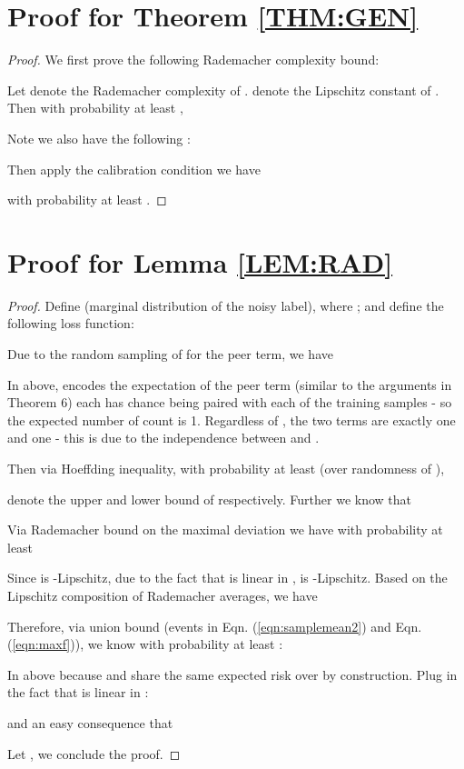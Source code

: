 \section*{Proof for Theorem \ref{THM:GEN}}


\begin{proof}

We first prove the following Rademacher complexity bound:
 \begin{lemma}\label{LEM:RAD}
 Let  denote the Rademacher complexity of .  denote the Lipschitz constant of . Then with probability at least ,  \end{lemma}
Note we also have the following :

Then apply the calibration condition we have

with probability at least .
\end{proof}
\section*{Proof for Lemma \ref{LEM:RAD}}

\begin{proof}
 Define  (marginal distribution of the noisy label), where ; and
define the following loss function:

Due to the random sampling of  for the peer term, we have

In above,   encodes the expectation of the peer term (similar to the arguments in Theorem 6) each  has  chance being paired with each of the training samples - so the expected number of count is 1. Regardless of , the two terms are exactly one  and one  - this is due to the independence between  and .

Then via Hoeffding inequality, with probability at least  (over randomness of ), 

 denote the upper and lower bound of  respectively. Further we know that 




Via Rademacher bound on the maximal deviation we have with probability at least 

Since  is -Lipschitz, due to the fact that   is linear in 
,  is -Lipschitz. Based on the Lipschitz composition of Rademacher averages, we have

Therefore, via union bound (events in Eqn. (\ref{eqn:samplemean2}) and Eqn. (\ref{eqn:maxf})), we know with probability at least :

In above  because  and  share the same expected risk over  by construction.
 Plug in the fact that
   is linear in :
 
 and an easy consequence that

Let , we conclude the proof.

\end{proof}

